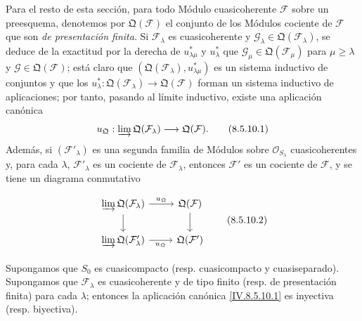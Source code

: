 \begin{env}[8.5.10]
\label{IV.8.5.10-fr}
Para el resto de esta sección, para todo Módulo cuasicoherente $\mathcal F$ sobre un preesquema, denotemos por $\mathfrak Q(\mathcal F)$ el conjunto de los Módulos cociente de $\mathcal F$ que son \emph{de presentación finita}. Si $\mathcal F_\lambda$ es cuasicoherente y $\mathcal G_\lambda\in\mathfrak Q(\mathcal F_\lambda)$, se deduce de la exactitud por la derecha de $u_{\lambda\mu}^*$ y $u_\lambda^*$ que $\mathcal G_\mu\in\mathfrak Q(\mathcal F_\mu)$ para $\mu\geq\lambda$ y $\mathcal G\in\mathfrak Q(\mathcal F)$; está claro que $(\mathfrak Q(\mathcal F_\lambda),u_{\lambda\mu}^*)$ es un sistema inductivo de conjuntos y que los $u_\lambda^*:\mathfrak Q(\mathcal F_\lambda)\to\mathfrak Q(\mathcal F)$ forman un sistema inductivo de aplicaciones; por tanto, pasando al límite inductivo, existe una aplicación canónica
\begin{equation}
  u_{\mathfrak Q}:\varinjlim\mathfrak Q(\mathcal F_\lambda)
  \longrightarrow\mathfrak Q(\mathcal F).
  \tag{8.5.10.1}\label{IV.8.5.10.1-fr}
\end{equation}
Además, si $(\mathcal F'_\lambda)$ es una segunda familia de Módulos sobre $\mathcal O_{S_\lambda}$ cuasicoherentes y, para cada $\lambda$, $\mathcal F'_\lambda$ es un cociente de $\mathcal F_\lambda$, entonces $\mathcal F'$ es un cociente de $\mathcal F$, y se tiene un diagrama conmutativo


\[
\begin{tikzcd}
\varinjlim\mathfrak Q(\mathcal F_\lambda)
  \ar[r,"u_{\mathfrak Q}"] \ar[d]
  & \mathfrak Q(\mathcal F) \ar[d] \\
\varinjlim\mathfrak Q(\mathcal F'_\lambda)
  \ar[r,"u_{\mathfrak Q}"']
  & \mathfrak Q(\mathcal F')
\end{tikzcd}
\tag{8.5.10.2}\label{IV.8.5.10.2-fr}
\]
\end{env}

\begin{proposition}[8.5.11]
\label{IV.8.5.11-fr}
Supongamos que $S_0$ es cuasicompacto \textup{(resp.} cuasicompacto y cuasiseparado\textup{)}. Supongamos que $\mathcal F_\lambda$ es cuasicoherente y de tipo finito \textup{(resp.} de presentación finita\textup{)} para cada $\lambda$; entonces la aplicación canónica \eqref{IV.8.5.10.1} es inyectiva \textup{(resp.} biyectiva\textup{)}.
\end{proposition}

